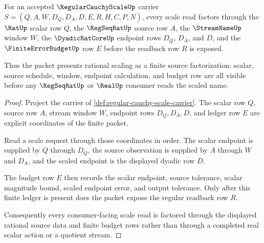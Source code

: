 \begin{theorem}
\label{thm:regular-cauchy-scale-source-factorization}
For an accepted $\RegularCauchyScaleUp$ carrier $S=(Q,A,W,D_Q,D_A,D,E,R,H,C,P,N)$, every scale read factors through the $\RatUp$ scalar row $Q$, the $\RegSeqRatUp$ source row $A$, the $\StreamNameUp$ window $W$, the $\DyadicRatCoreUp$ endpoint rows $D_Q$, $D_A$, and $D$, and the $\FiniteErrorBudgetUp$ row $E$ before the readback row $R$ is exposed.

Thus the packet presents rational scaling as a finite source factorization: scalar, source schedule, window, endpoint calculation, and budget row are all visible before any $\RegSeqRatUp$ or $\RealUp$ consumer reads the scaled name.
\end{theorem}
\begin{proof}
Project the carrier of \autoref{def:regular-cauchy-scale-carrier}. The scalar row $Q$, source row $A$, stream window $W$, endpoint rows $D_Q,D_A,D$, and ledger row $E$ are explicit coordinates of the finite packet.

Read a scale request through those coordinates in order. The scalar endpoint is supplied by $Q$ through $D_Q$, the source observation is supplied by $A$ through $W$ and $D_A$, and the scaled endpoint is the displayed dyadic row $D$.

The budget row $E$ then records the scalar endpoint, source tolerance, scalar magnitude bound, scaled endpoint error, and output tolerance. Only after this finite ledger is present does the packet expose the regular readback row $R$.

Consequently every consumer-facing scale read is factored through the displayed rational source data and finite budget rows rather than through a completed real scalar action or a quotient stream.
\end{proof}

